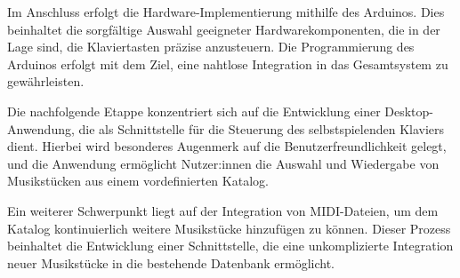 Im Anschluss erfolgt die Hardware-Implementierung mithilfe des Arduinos. Dies beinhaltet die sorgfältige
Auswahl geeigneter Hardwarekomponenten, die in der Lage sind, die Klaviertasten präzise anzusteuern.
Die Programmierung des Arduinos erfolgt mit dem Ziel, eine nahtlose Integration in das Gesamtsystem zu
gewährleisten. \newline

Die nachfolgende Etappe konzentriert sich auf die Entwicklung einer
Desktop-Anwendung, die als Schnittstelle für die Steuerung des selbstspielenden Klaviers dient. Hierbei wird
besonderes Augenmerk auf die Benutzerfreundlichkeit gelegt, und die Anwendung ermöglicht Nutzer:innen die
Auswahl und Wiedergabe von Musikstücken aus einem vordefinierten Katalog. \newline

Ein weiterer Schwerpunkt liegt auf der Integration von MIDI-Dateien, um dem Katalog kontinuierlich weitere
Musikstücke hinzufügen zu können. Dieser Prozess beinhaltet die Entwicklung einer Schnittstelle, die eine
unkomplizierte Integration neuer Musikstücke in die bestehende Datenbank ermöglicht.

